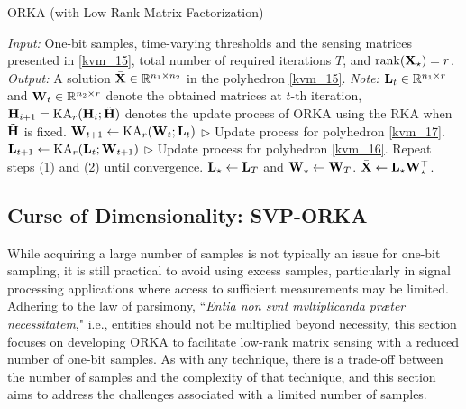\documentclass[12pt,draftcls,onecolumn]{IEEEtran}
\begin{document}
\begin{algorithm}[t]
\caption{ORKA (with Low-Rank Matrix Factorization)}
\label{algorithm_200}
\begin{algorithmic}[1]
\Statex \emph{Input:} One-bit samples, 
time-varying thresholds and
the sensing %
matrices presented in \eqref{kvm_15},
total number of required iterations $T$, and $\operatorname{rank}(\mathbf{X}_{\star})=r$.
\Statex \emph{Output:} A solution $\bar{\mathbf{X}}\in\mathbb{R}^{n_1\times n_2}$ in the polyhedron \eqref{kvm_15}.
\Statex \emph{Note:} $\mathbf{L}_t\in\mathbb{R}^{n_1\times r}$ and $\mathbf{W}_t\in\mathbb{R}^{n_2\times r}$ denote the obtained matrices at $t$-th iteration, $\mathbf{H}_{i+1}=\mathrm{KA}_{r}(\mathbf{H}_{i};\Tilde{\mathbf{H}})$ denotes the update process of ORKA using the RKA when $\Tilde{\mathbf{H}}$ is fixed.
\State $\mathbf{W}_{t+1}\gets\mathrm{KA}_{r}(\mathbf{W}_t;\mathbf{L}_t)$ $\triangleright$ Update process for polyhedron \eqref{kvm_17}.
\State $\mathbf{L}_{t+1}\gets\mathrm{KA}_{r}(\mathbf{L}_t;\mathbf{W}_{t+1})$ $\triangleright$ Update process for polyhedron \eqref{kvm_16}.
\State Repeat steps (1) and (2) until convergence. %
\State %
$\mathbf{L}_{\star}\gets\mathbf{L}_T$ and $\mathbf{W}_{\star}\gets\mathbf{W}_T$.
\State \Return  $\bar{\mathbf{X}}\gets\mathbf{L}_{\star}\mathbf{W}^{\top}_{\star}$.
\end{algorithmic}
\end{algorithm}

\subsection{Curse of Dimensionality: SVP-ORKA}
\label{SVP}
While acquiring a large number of samples is not typically an issue for one-bit sampling, it is still practical to avoid using excess samples, particularly in signal processing applications where access to sufficient measurements may be limited. Adhering to the law of parsimony, ``\emph{Entia non svnt mvltiplicanda præter necessitatem}," i.e., entities should not be multiplied beyond necessity, this section focuses on developing ORKA to facilitate low-rank matrix sensing with a reduced number of one-bit samples. As with any technique, there is a trade-off between the number of samples and the complexity of that technique, and this section aims to address the challenges associated with a limited number of samples.
\end{document}
